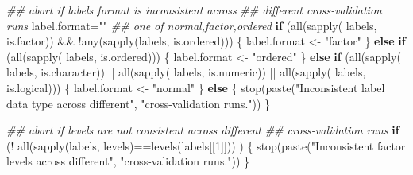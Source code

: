 \documentclass[
  letterpaper,
  DIV=11,
  numbers=noendperiod]{scrartcl}
\newenvironment{Shaded}{\begin{snugshade}}{\end{snugshade}}
\newcommand{\ControlFlowTok}[1]{\textcolor[rgb]{0.00,0.23,0.31}{\textbf{#1}}}
\newcommand{\DecValTok}[1]{\textcolor[rgb]{0.68,0.00,0.00}{#1}}
\newcommand{\DocumentationTok}[1]{\textcolor[rgb]{0.37,0.37,0.37}{\textit{#1}}}
\newcommand{\FunctionTok}[1]{\textcolor[rgb]{0.28,0.35,0.67}{#1}}
\newcommand{\NormalTok}[1]{\textcolor[rgb]{0.00,0.23,0.31}{#1}}
\newcommand{\OtherTok}[1]{\textcolor[rgb]{0.00,0.23,0.31}{#1}}
\newcommand{\SpecialCharTok}[1]{\textcolor[rgb]{0.37,0.37,0.37}{#1}}
\newcommand{\StringTok}[1]{\textcolor[rgb]{0.13,0.47,0.30}{#1}}
\begin{document}
\begin{Shaded}
\begin{Highlighting}[]
    \DocumentationTok{\#\# abort if \textquotesingle{}labels\textquotesingle{} format is inconsistent across}
    \DocumentationTok{\#\# different cross{-}validation runs}
\NormalTok{    label.format}\OtherTok{=}\StringTok{""}  \DocumentationTok{\#\# one of \textquotesingle{}normal\textquotesingle{},\textquotesingle{}factor\textquotesingle{},\textquotesingle{}ordered\textquotesingle{}}
    \ControlFlowTok{if}\NormalTok{ (}\FunctionTok{all}\NormalTok{(}\FunctionTok{sapply}\NormalTok{( labels, is.factor)) }\SpecialCharTok{\&\&}
        \SpecialCharTok{!}\FunctionTok{any}\NormalTok{(}\FunctionTok{sapply}\NormalTok{(labels, is.ordered))) \{}
\NormalTok{        label.format }\OtherTok{\textless{}{-}} \StringTok{"factor"}
\NormalTok{    \} }\ControlFlowTok{else} \ControlFlowTok{if}\NormalTok{ (}\FunctionTok{all}\NormalTok{(}\FunctionTok{sapply}\NormalTok{( labels, is.ordered))) \{}
\NormalTok{        label.format }\OtherTok{\textless{}{-}} \StringTok{"ordered"}
\NormalTok{    \} }\ControlFlowTok{else} \ControlFlowTok{if}\NormalTok{ (}\FunctionTok{all}\NormalTok{(}\FunctionTok{sapply}\NormalTok{( labels, is.character)) }\SpecialCharTok{||} 
               \FunctionTok{all}\NormalTok{(}\FunctionTok{sapply}\NormalTok{( labels, is.numeric)) }\SpecialCharTok{||}
               \FunctionTok{all}\NormalTok{(}\FunctionTok{sapply}\NormalTok{( labels, is.logical))) \{}
\NormalTok{        label.format }\OtherTok{\textless{}{-}} \StringTok{"normal"}
\NormalTok{    \} }\ControlFlowTok{else}\NormalTok{ \{}
        \FunctionTok{stop}\NormalTok{(}\FunctionTok{paste}\NormalTok{(}\StringTok{"Inconsistent label data type across different"}\NormalTok{,}
                   \StringTok{"cross{-}validation runs."}\NormalTok{))}
\NormalTok{    \}}
    
    \DocumentationTok{\#\# abort if levels are not consistent across different}
    \DocumentationTok{\#\# cross{-}validation runs}
    \ControlFlowTok{if}\NormalTok{ (}\SpecialCharTok{!} \FunctionTok{all}\NormalTok{(}\FunctionTok{sapply}\NormalTok{(labels, levels)}\SpecialCharTok{==}\FunctionTok{levels}\NormalTok{(labels[[}\DecValTok{1}\NormalTok{]])) ) \{}
        \FunctionTok{stop}\NormalTok{(}\FunctionTok{paste}\NormalTok{(}\StringTok{"Inconsistent factor levels across different"}\NormalTok{,}
                   \StringTok{"cross{-}validation runs."}\NormalTok{))}
\NormalTok{    \}}
        

\end{Highlighting}
\end{Shaded}
\end{document}
